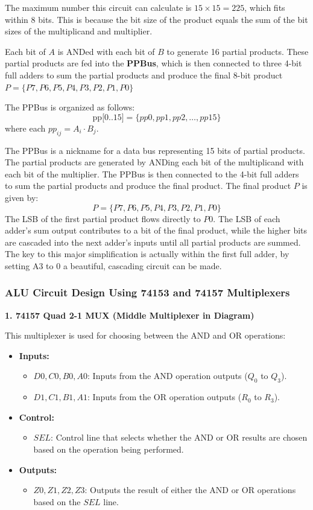 \documentclass[12pt]{article}
\begin{document}
The maximum number this circuit can calculate is \( 15 \times 15 = 225 \), which fits within 8 bits. This is because the bit size of the product equals the sum of the bit sizes of the multiplicand and multiplier.

Each bit of \( A \) is ANDed with each bit of \( B \) to generate 16 partial products.
These partial products are fed into the \textbf{PPBus}, which is then connected to three 4-bit full adders to sum the partial products and produce the final 8-bit product \( P = \{P7, P6, P5, P4, P3, P2, P1, P0\} \)

The PPBus is organized as follows:
\[
	\text{pp[0..15]} = \{ pp0, pp1, pp2, \dots, pp15 \}
\]
where each \( pp_{ij} = A_i \cdot B_j \).

The PPBus is a nickname for a data bus representing 15 bits of partial products. The partial products are generated by ANDing each bit of the multiplicand with each bit of the multiplier. The PPBus is then connected to the 4-bit full adders to sum the partial products and produce the final product.
The final product \( P \) is given by:
\[
	P = \{ P7, P6, P5, P4, P3, P2, P1, P0 \}
\]
The LSB of the first partial product flows directly to \( P0 \). The LSB of each adder's sum output contributes to a bit of the final product, while the higher bits are cascaded into the next adder’s inputs until all partial products are summed. The key to this major simplification is actually within the first full adder, by setting A3 to \(0\) a beautiful, cascading circuit can be made.
\subsubsection*{ALU Circuit Design Using 74153 and 74157 Multiplexers}
\textbf{1. 74157 Quad 2-1 MUX (Middle Multiplexer in Diagram)}

This multiplexer is used for choosing between the AND and OR operations:
\begin{itemize}
	\item \textbf{Inputs:}
	      \begin{itemize}
		      \item \( D0, C0, B0, A0 \): Inputs from the AND operation outputs (\( Q_0 \) to \( Q_3 \)).
		      \item \( D1, C1, B1, A1 \): Inputs from the OR operation outputs (\( R_0 \) to \( R_3 \)).
	      \end{itemize}
	\item \textbf{Control:}
	      \begin{itemize}
		      \item \( SEL \): Control line that selects whether the AND or OR results are chosen based on the operation being performed.
	      \end{itemize}
	\item \textbf{Outputs:}
	      \begin{itemize}
		      \item \( Z0, Z1, Z2, Z3 \): Outputs the result of either the AND or OR operations based on the \( SEL \) line.
	      \end{itemize}
\end{itemize}
\end{document}
